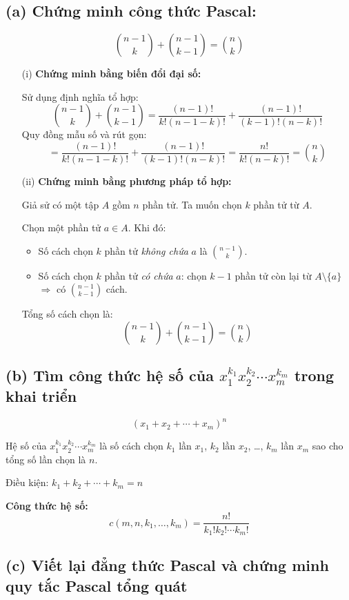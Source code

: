 \documentclass{article}
\begin{document}
	\subsection*{(a) Chứng minh công thức Pascal:}
	\[
	\binom{n - 1}{k} + \binom{n - 1}{k - 1} = \binom{n}{k}
	\]
	
	\begin{itemize}
		\item[(i)] \textbf{Chứng minh bằng biến đổi đại số:}
		
		Sử dụng định nghĩa tổ hợp:
		\[
		\binom{n - 1}{k} + \binom{n - 1}{k - 1}
		= \frac{(n - 1)!}{k!(n - 1 - k)!} + \frac{(n - 1)!}{(k - 1)!(n - k)!}
		\]
		Quy đồng mẫu số và rút gọn:
		\[
		= \frac{(n - 1)!}{k!(n - 1 - k)!} + \frac{(n - 1)!}{(k - 1)!(n - k)!}
		= \frac{n!}{k!(n - k)!} = \binom{n}{k}
		\]
		
		\item[(ii)] \textbf{Chứng minh bằng phương pháp tổ hợp:}
		
		Giả sử có một tập $A$ gồm $n$ phần tử. Ta muốn chọn $k$ phần tử từ $A$.
		
		Chọn một phần tử $a \in A$. Khi đó:
		\begin{itemize}
			\item Số cách chọn $k$ phần tử \textit{không chứa} $a$ là $\binom{n - 1}{k}$.
			\item Số cách chọn $k$ phần tử \textit{có chứa} $a$: chọn $k - 1$ phần tử còn lại từ $A \setminus \{a\}$ $\Rightarrow$ có $\binom{n - 1}{k - 1}$ cách.
		\end{itemize}
		
		Tổng số cách chọn là:
		\[
		\binom{n - 1}{k} + \binom{n - 1}{k - 1} = \binom{n}{k}
		\]
	\end{itemize}
	
	\subsection*{(b) Tìm công thức hệ số của $x_1^{k_1}x_2^{k_2}\cdots x_m^{k_m}$ trong khai triển}
	\[
	(x_1 + x_2 + \cdots + x_m)^n
	\]
	
	Hệ số của $x_1^{k_1}x_2^{k_2}\cdots x_m^{k_m}$ là số cách chọn $k_1$ lần $x_1$, $k_2$ lần $x_2$, \ldots, $k_m$ lần $x_m$ sao cho tổng số lần chọn là $n$.
	
	Điều kiện: $k_1 + k_2 + \cdots + k_m = n$
	
	\textbf{Công thức hệ số:}
	\[
	c(m,n,k_1,\ldots,k_m) = \frac{n!}{k_1! k_2! \cdots k_m!}
	\]
	
	\subsection*{(c) Viết lại đẳng thức Pascal và chứng minh quy tắc Pascal tổng quát}
	
\end{document}
